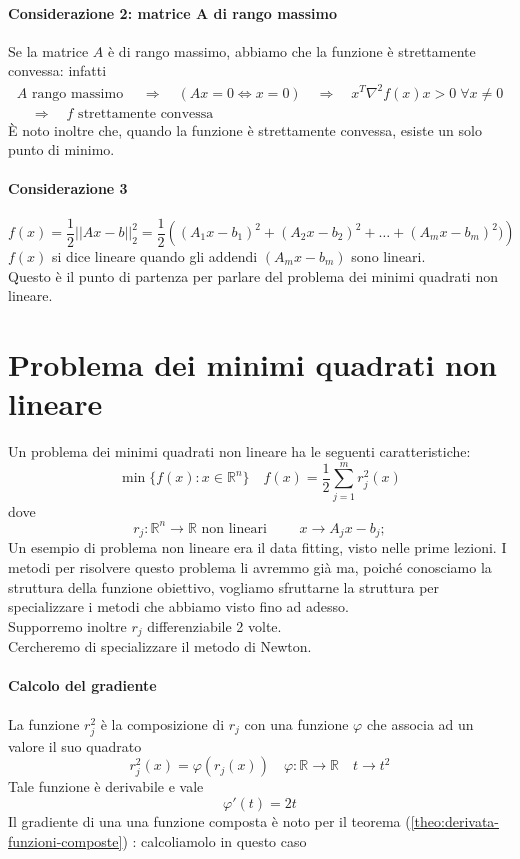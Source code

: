 \paragraph{Considerazione 2: matrice A di rango massimo}
Se la matrice $A$ \`e di rango massimo,
abbiamo che la funzione \`e strettamente convessa: infatti
$$
\begin{array}{c}
 A \text { rango massimo } \quad
 \Longrightarrow  \quad ( Ax=0 \Longleftrightarrow x =0 ) \quad 
 \Longrightarrow \quad  x^{T}\nabla^{2} f(x)x  > 0 \; 
\forall x \neq 0  \\
\quad \Longrightarrow \quad f \text{ strettamente convessa }
\end{array}
$$
\`E noto inoltre che, quando la funzione \`e strettamente convessa, 
esiste un solo punto di minimo.

\paragraph{Considerazione 3}
$$ f(x) = \frac{1}{2} || Ax -b||_{2}^{2} =
\frac{1}{2}\left((A_1x -b_1)^{2} + (A_2x - b_2)^{2} +
\ldots   + (A_mx -b_m)^{2})\right)$$
$f(x)$ si dice lineare quando gli addendi $ (A_mx -b_m)$ sono lineari. \\
Questo \`e il punto di partenza per parlare del problema
dei minimi quadrati non lineare.

\section{Problema dei minimi quadrati non lineare}
Un problema dei minimi quadrati non lineare ha le seguenti caratteristiche:
$$ \min \{f(x) : x \in \mathbb{R}^{n} \} \quad
f(x) = \frac{1}{2} \displaystyle \sum_{j=1}^{m} r_j^{2}(x) $$
dove
$$r_j: \mathbb{R}^{n} \rightarrow \mathbb{R} \text{ non lineari } 
\qquad  x \rightarrow A_jx-b_j;$$
Un esempio di problema non lineare era il data fitting, visto nelle
prime lezioni. I metodi per risolvere questo problema li avremmo gi\`a ma,
poich\'e conosciamo la struttura della funzione obiettivo,
vogliamo sfruttarne la struttura  per specializzare i metodi che
 abbiamo visto fino ad adesso. \\
Supporremo inoltre $r_j$ differenziabile 2 volte.\\
Cercheremo di specializzare il metodo di Newton. \\
\paragraph{Calcolo del gradiente}
La funzione $r_j^{2}$ è la composizione di $r_j$ con una funzione $\varphi$
che associa ad un valore il suo quadrato
$$ r_j^2(x) = \varphi(r_j(x)) \quad \varphi: \mathbb{R} \rightarrow \mathbb{R}
\quad t \rightarrow t^2$$
Tale funzione è derivabile e vale
$$ \varphi'(t) = 2t$$
Il gradiente di una una funzione composta \`e noto per il teorema 
(\ref{theo:derivata-funzioni-composte}) : calcoliamolo in questo caso

